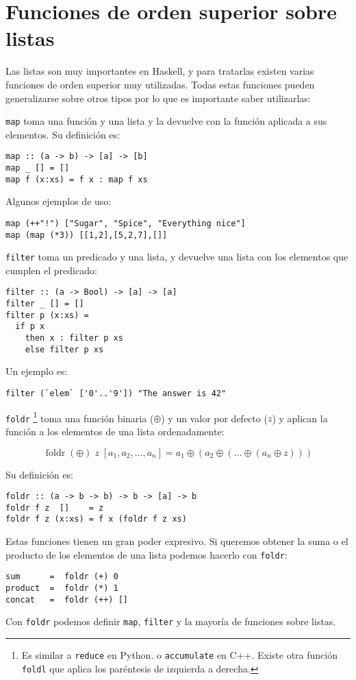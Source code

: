 \section{Funciones de orden superior sobre listas}
Las listas son muy importantes en Haskell, y para tratarlas existen varias
funciones de orden superior muy utilizadas. Todas estas funciones pueden
generalizarse sobre otros tipos por lo que es importante saber utilizarlas:

\texttt{map} toma una función y una lista y la devuelve con la función aplicada
a sus elementos. Su definición es:
\begin{lstlisting}
map :: (a -> b) -> [a] -> [b]
map _ [] = []
map f (x:xs) = f x : map f xs
\end{lstlisting}

Algunos ejemplos de uso:
\begin{lstlisting}
map (++"!") ["Sugar", "Spice", "Everything nice"]
map (map (*3)) [[1,2],[5,2,7],[]]
\end{lstlisting}

\texttt{filter} toma un predicado y una lista, y devuelve una lista con los elementos
que cumplen el predicado:
\begin{lstlisting}
filter :: (a -> Bool) -> [a] -> [a]
filter _ [] = []
filter p (x:xs) =
  if p x
    then x : filter p xs
    else filter p xs
\end{lstlisting}

Un ejemplo es:

\begin{lstlisting}
filter (`elem` ['0'..'9']) "The answer is 42"
\end{lstlisting}

\texttt{foldr}
\footnote{Es similar a \texttt{reduce} en Python. o \texttt{accumulate} en C++.
Existe otra función \texttt{foldl} que aplica los paréntesis de izquierda a derecha.}
toma una función binaria ($\oplus$) y un valor por defecto ($z$) y
aplican la función a los elementos de una lista ordenadamente:

\begin{equation*}
\operatorname{foldr} (\oplus) \; z \; [a_1 , a_2 , \dots , a_n] =
 a_1 \oplus  (a_2 \oplus  (\dots \oplus  (a_n \oplus  z )))
\end{equation*}

Su definición es:

\begin{lstlisting}
foldr :: (a -> b -> b) -> b -> [a] -> b
foldr f z  []    = z
foldr f z (x:xs) = f x (foldr f z xs)
\end{lstlisting}

Estas funciones tienen un gran poder expresivo. Si queremos obtener la suma
o el producto de los elementos de una lista podemos hacerlo con \texttt{foldr}:

\begin{lstlisting}
sum      =  foldr (+) 0
product  =  foldr (*) 1
concat   =  foldr (++) []
\end{lstlisting}

Con \texttt{foldr} podemos definir \texttt{map}, \texttt{filter} y la mayoría de
funciones sobre listas.
